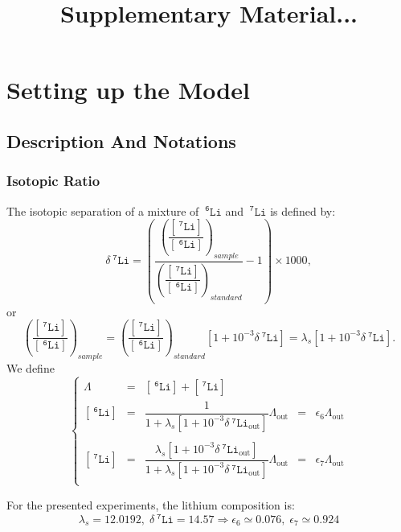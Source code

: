 \documentclass[aps,onecolumn,11pt]{revtex4}
\newcommand{\mychem}[1]{\mathtt{#1}}
\newcommand{\myconc}[1]{\left\lbrack{#1}\right\rbrack}
\newcommand{\spLi}[1]{{~^{\mychem{#1}}\mychem{Li}}}
\newcommand{\Li}[1]{\myconc{\spLi{#1}}}
\newcommand{\deltaLi}{ {\delta\!\!\!\spLi{7}} }
\newcommand{\deltaLiOut}{{\deltaLi}_{\mathrm{out}}}
\newcommand{\LiAll}{\Lambda}
\newcommand{\LiAllOut}{{\LiAll}_{\mathrm{out}}}
\begin{document}
\title{Supplementary Material...}
\maketitle

\section{Setting up the Model}

\subsection{Description And Notations}

\subsubsection{Isotopic Ratio}
The isotopic separation of a mixture of $\spLi{6}$ and $\spLi{7}$ is defined by:
\begin{equation}
	\deltaLi = \left(
		\dfrac{\left(\dfrac{\Li{7}}{\Li{6}}\right)_{sample}}
		{\left(\dfrac{\Li{7}}{\Li{6}}\right)_{standard}}
		 -1 
	\right) \times 1000,
\end{equation}
or
\begin{equation}
	\left(\dfrac{\Li{7}}{\Li{6}}\right)_{sample} = \left(\dfrac{\Li{7}}{\Li{6}}\right)_{standard} \left[1+10^{-3}\deltaLi\right] = \lambda_s \left[1+10^{-3}\deltaLi\right].
\end{equation}
We define
\begin{equation}
\left\lbrace
\begin{array}{rclcl}
	\LiAll & = & \Li{6} + \Li{7}\\
	\Li{6} & = & \dfrac{1}{1+\lambda_s \left[1+10^{-3}\deltaLiOut\right] } \LiAllOut & = & \epsilon_6 \LiAllOut   \\
	\\
	\Li{7} & = & \dfrac{\lambda_s \left[1+10^{-3}\deltaLiOut\right]}{1+\lambda_s \left[1+10^{-3}\deltaLiOut\right] } \LiAllOut & = & \epsilon_7 \LiAllOut\\
\end{array}
\right.
\end{equation}

For the presented experiments, the lithium composition is:
\begin{equation}
	\lambda_s = 12.0192, \; \deltaLi = 14.57 \Rightarrow \epsilon_6 \simeq 0.076,\;\epsilon_7 \simeq 0.924
\end{equation}
\end{document}
